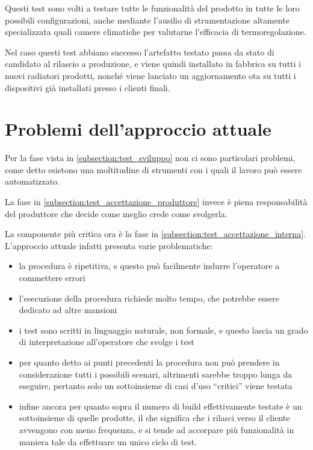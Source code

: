 \documentclass[12pt,a4paper,twoside,titlepage]{book}
\begin{document}
Questi test sono volti a testare tutte le funzionalità del prodotto in tutte le loro
possibili configurazioni, anche mediante l'ausilio di strumentazione altamente
specializzata quali camere climatiche per valutarne l'efficacia di termoregolazione.

Nel caso questi test abbiano successo l'artefatto testato passa da stato di candidato
al rilascio a produzione, e viene quindi installato in fabbrica su tutti i nuovi radiatori
prodotti, nonché viene lanciato un aggiornamento \acrshort{ota} su tutti i dispositivi già installati
presso i clienti finali.

\section{Problemi dell'approccio attuale}

Per la fase vista in \autoref{subsection:test_sviluppo} non ci sono particolari problemi,
come detto esistono una moltitudine di strumenti con i quali il lavoro può essere automatizzato. 

La fase in \autoref{subsection:test_accettazione_produttore} invece è piena responsabilità del 
\gls{produttore} che decide come meglio crede come svolgerla. 

La componente più critica ora è la fase in \autoref{subsection:test_accettazione_interna}. 
L'approccio attuale infatti presenta varie problematiche:
\begin{itemize}
    \item la procedura è ripetitiva, e questo può facilmente indurre
        l'operatore a commettere errori
    \item l'esecuzione della procedura richiede molto tempo, che potrebbe essere dedicato
        ad altre mansioni
    \item i test sono scritti in linguaggio naturale, non formale, e questo lascia un grado di 
        interpretazione all'operatore che svolge i test
    \item per quanto detto ai punti precedenti la procedura non può prendere in considerazione 
        tutti i possibili scenari, altrimenti sarebbe troppo lunga da eseguire, pertanto solo un 
        sottoinsieme di casi d'uso ``critici'' viene testata
    \item infine ancora per quanto sopra il numero di build effettivamente testate
        è un sottoinsieme di quelle prodotte, il che significa che
        i rilasci verso il cliente avvengono con meno frequenza, e si tende ad accorpare
        più funzionalità in maniera tale da effettuare un unico ciclo di test.
\end{itemize}
\end{document}

